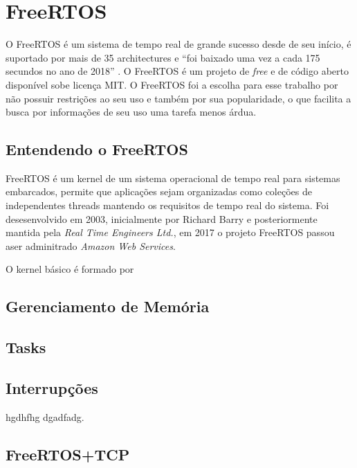\chapter{FreeRTOS}


O FreeRTOS é um sistema de tempo real de grande sucesso desde de seu início,
é suportado por mais de 35 architectures e ``foi baixado uma vez a cada 175
secundos no ano de 2018'' \cite{FreeRTOS_history}. O FreeRTOS é um projeto de
\textit{free} e de código aberto disponível sobe licença MIT. O FreeRTOS foi
a escolha para esse trabalho por não possuir restrições ao seu uso e também
por sua popularidade, o que facilita a busca por informações de seu uso uma
tarefa menos árdua.

\section{Entendendo o FreeRTOS}

FreeRTOS é um kernel de um sistema operacional de tempo real para sistemas
embarcados, permite que aplicações sejam organizadas como coleções de 
independentes threads mantendo os requisitos de tempo real do sistema.
Foi desesenvolvido em 2003, inicialmente por Richard Barry e posteriormente
mantida pela \textit{Real Time Engineers Ltd.}, em 2017 o projeto 
FreeRTOS passou aser adminitrado \textit{Amazon Web Services}.

O kernel básico é formado por 

 

\section{Gerenciamento de Memória}

\section{Tasks}

\section{Interrupções}


hgdhfhg \faApple dgadfadg.

\section{FreeRTOS+TCP}

